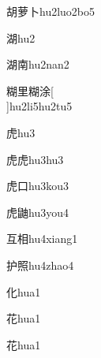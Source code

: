 \begin{verbete}[9;11;2]{胡萝卜}{hu2luo2bo5}
\end{verbete}

\begin{verbete}[12]{湖}{hu2}
\end{verbete}

\begin{verbete*}[12;9]{湖南}{hu2nan2}
\end{verbete*}

\begin{verbete}[15;7;15;10]{糊里糊涂}[\\]{hu2li5hu2tu5}
\end{verbete}

\begin{verbete}[8]{虎}{hu3}
\end{verbete}

\begin{verbete}[8;8]{虎虎}{hu3hu3}
\end{verbete}

\begin{verbete}[8;3]{虎口}{hu3kou3}
\end{verbete}

\begin{verbete}[8;18]{虎鼬}{hu3you4}
\end{verbete}

\begin{verbete}[4;9]{互相}{hu4xiang1}
\end{verbete}

\begin{verbete}[7;13]{护照}{hu4zhao4}
\end{verbete}

\begin{verbete}[4]{化}{hua1}
\end{verbete}

\begin{verbete}[7]{花}{hua1}
\end{verbete}
\begin{verbete*}[7]{花}{hua1}
\end{verbete*}

